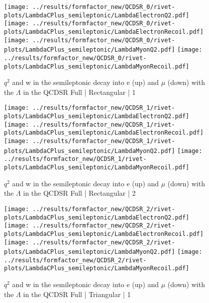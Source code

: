 \begin{figure}[h]
  \centering
  \texttt{[image: ../results/formfactor\_new/QCDSR\_0/rivet-plots/LambdaCPlus\_semileptonic/LambdaElectronQ2.pdf]}
  \texttt{[image: ../results/formfactor\_new/QCDSR\_0/rivet-plots/LambdaCPlus\_semileptonic/LambdaElectronRecoil.pdf]}\\
  \texttt{[image: ../results/formfactor\_new/QCDSR\_0/rivet-plots/LambdaCPlus\_semileptonic/LambdaMyonQ2.pdf]}
  \texttt{[image: ../results/formfactor\_new/QCDSR\_0/rivet-plots/LambdaCPlus\_semileptonic/LambdaMyonRecoil.pdf]}
  \caption{\(q^2\) and w in the semileptonic decay into e (up) and \(\mu\) (down) with the \(\Lambda\) in the QCDSR Full | Rectangular | 1}
\end{figure}
\begin{figure}[h]
  \centering
  \texttt{[image: ../results/formfactor\_new/QCDSR\_1/rivet-plots/LambdaCPlus\_semileptonic/LambdaElectronQ2.pdf]}
  \texttt{[image: ../results/formfactor\_new/QCDSR\_1/rivet-plots/LambdaCPlus\_semileptonic/LambdaElectronRecoil.pdf]}\\
  \texttt{[image: ../results/formfactor\_new/QCDSR\_1/rivet-plots/LambdaCPlus\_semileptonic/LambdaMyonQ2.pdf]}
  \texttt{[image: ../results/formfactor\_new/QCDSR\_1/rivet-plots/LambdaCPlus\_semileptonic/LambdaMyonRecoil.pdf]}
  \caption{\(q^2\) and w in the semileptonic decay into e (up) and \(\mu\) (down) with the \(\Lambda\) in the QCDSR Full | Rectangular | 2}
\end{figure}
\begin{figure}[h]
  \centering
  \texttt{[image: ../results/formfactor\_new/QCDSR\_2/rivet-plots/LambdaCPlus\_semileptonic/LambdaElectronQ2.pdf]}
  \texttt{[image: ../results/formfactor\_new/QCDSR\_2/rivet-plots/LambdaCPlus\_semileptonic/LambdaElectronRecoil.pdf]}\\
  \texttt{[image: ../results/formfactor\_new/QCDSR\_2/rivet-plots/LambdaCPlus\_semileptonic/LambdaMyonQ2.pdf]}
  \texttt{[image: ../results/formfactor\_new/QCDSR\_2/rivet-plots/LambdaCPlus\_semileptonic/LambdaMyonRecoil.pdf]}
  \caption{\(q^2\) and w in the semileptonic decay into e (up) and \(\mu\) (down) with the \(\Lambda\) in the QCDSR Full | Triangular | 1}
\end{figure}

